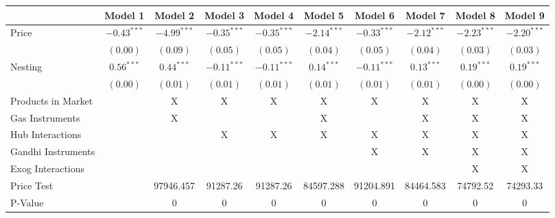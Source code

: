 
\begin{tabular}{l c c c c c c c c c}
\toprule
 & Model 1 & Model 2 & Model 3 & Model 4 & Model 5 & Model 6 & Model 7 & Model 8 & Model 9 \\
\midrule
Price                       & $-0.43^{***}$ & $-4.99^{***}$ & $-0.35^{***}$ & $-0.35^{***}$ & $-2.14^{***}$ & $-0.33^{***}$ & $-2.12^{***}$ & $-2.23^{***}$ & $-2.20^{***}$ \\
                            & $(0.00)$      & $(0.09)$      & $(0.05)$      & $(0.05)$      & $(0.04)$      & $(0.05)$      & $(0.04)$      & $(0.03)$      & $(0.03)$      \\
Nesting                     & $0.56^{***}$  & $0.44^{***}$  & $-0.11^{***}$ & $-0.11^{***}$ & $0.14^{***}$  & $-0.11^{***}$ & $0.13^{***}$  & $0.19^{***}$  & $0.19^{***}$  \\
                            & $(0.00)$      & $(0.01)$      & $(0.01)$      & $(0.01)$      & $(0.01)$      & $(0.01)$      & $(0.01)$      & $(0.00)$      & $(0.00)$      \\
\midrule
Products in Market          &               & X             & X             & X             & X             & X             & X             & X             & X             \\
Gas Instruments             &               & X             &               &               & X             &               & X             & X             & X             \\
Hub Interactions            &               &               & X             & X             & X             & X             & X             & X             & X             \\
Gandhi Instruments          &               &               &               &               &               & X             & X             & X             & X             \\
Exog Interactions           &               &               &               &               &               &               &               & X             & X             \\
Price Test                  &               & 97946.457     & 91287.26      & 91287.26      & 84597.288     & 91204.891     & 84464.583     & 74792.52      & 74293.33      \\
P-Value                     &               & 0             & 0             & 0             & 0             & 0             & 0             & 0             & 0             \\

\end{tabular}
